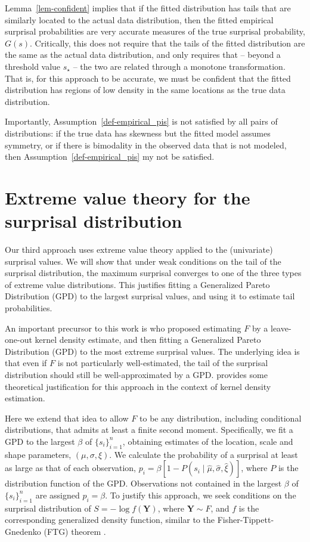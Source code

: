 \documentclass[
  12pt]{article}
\theoremstyle{plain}
\theoremstyle{plain}
\theoremstyle{definition}
\theoremstyle{plain}
\theoremstyle{remark}
\begin{document}
Lemma~\ref{lem-confident} implies that if the fitted distribution has
tails that are similarly located to the actual data distribution, then
the fitted empirical surprisal probabilities are very accurate measures
of the true surprisal probability, \(G(s)\). Critically, this does not
require that the tails of the fitted distribution are the same as the
actual data distribution, and only requires that -- beyond a threshold
value \(s_\star\) -- the two are related through a monotone
transformation. That is, for this approach to be accurate, we must be
confident that the fitted distribution has regions of low density in the
same locations as the true data distribution.

Importantly, Assumption~\ref{def-empirical_pis} is not satisfied by all
pairs of distributions: if the true data has skewness but the fitted
model assumes symmetry, or if there is bimodality in the observed data
that is not modeled, then Assumption~\ref{def-empirical_pis} my not be
satisfied.

\section{Extreme value theory for the surprisal
distribution}\label{sec-gpd}

Our third approach uses extreme value theory applied to the (univariate)
surprisal values. We will show that under weak conditions on the tail of
the surprisal distribution, the maximum surprisal converges to one of
the three types of extreme value distributions. This justifies fitting a
Generalized Pareto Distribution (GPD) to the largest surprisal values,
and using it to estimate tail probabilities.

An important precursor to this work is \citet{lookout} who proposed
estimating \(F\) by a leave-one-out kernel density estimate, and then
fitting a Generalized Pareto Distribution (GPD) to the most extreme
surprisal values. The underlying idea is that even if \(F\) is not
particularly well-estimated, the tail of the surprisal distribution
should still be well-approximated by a GPD. \citet{lookout2} provides
some theoretical justification for this approach in the context of
kernel density estimation.

Here we extend that idea to allow \(F\) to be any distribution,
including conditional distributions, that admits at least a finite
second moment. Specifically, we fit a GPD to the largest \(\beta\) of
\(\{s_i\}_{i=1}^n\), obtaining estimates of the location, scale and
shape parameters, \((\mu,\sigma,\xi)\). We calculate the probability of
a surprisal at least as large as that of each observation,
\(p_i = \beta\left[1-P(s_i \mid \hat\mu, \hat\sigma, \hat\xi)\right]\),
where \(P\) is the distribution function of the GPD. Observations not
contained in the largest \(\beta\) of \(\{s_i\}_{i=1}^n\) are assigned
\(p_i = \beta\). To justify this approach, we seek conditions on the
surprisal distribution of \(S = -\log f(\bm{Y})\), where
\(\bm{Y}\sim F\), and \(f\) is the corresponding generalized density
function, similar to the Fisher-Tippett-Gnedenko (FTG) theorem
\citep{coles2001introduction}.
\end{document}

